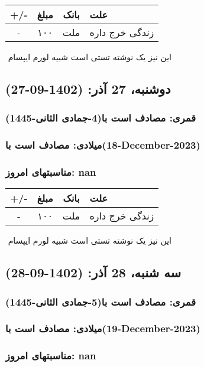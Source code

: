 \documentclass{article}
\newcommand{\rnote}[1]{\marginpar{\textcolor{color}{\StrSubstitute{\##1}{ }{\_}}}}
\newcommand{\myRow}[4]{
    #1 & #2 & #3 & #4 \\ \hline
}
\begin{document}
\begin{tabular}{ | c | c | c | p{5cm} |}
    \hline
    \myRow{ +/- }{مبلغ}{بانک}{علت}
    \myRow{-}{۱۰۰}{ملت}{زندگی خرج داره}
\end{tabular}
\newline
\newline

‌
\rnote{تست}
این نیز یک نوشته تستی است شبیه لورم ایپسام




\newpage
{}
\textcolor{color}{
\section{ دوشنبه، 27 آذر: (1402-09-27) }
\subsubsection*{قمری: مصادف است با(4-جمادی الثانی-1445)} 
\subsubsection*{میلادی: مصادف است با(18-December-2023)}
\subsubsection*{مناسبتهای امروز: nan}
}


\begin{tabular}{ | c | c | c | p{5cm} |}
    \hline
    \myRow{ +/- }{مبلغ}{بانک}{علت}
    \myRow{-}{۱۰۰}{ملت}{زندگی خرج داره}
\end{tabular}
\newline
\newline

‌
\rnote{تست}
این نیز یک نوشته تستی است شبیه لورم ایپسام




\newpage
{}
\textcolor{color}{
\section{ سه شنبه، 28 آذر: (1402-09-28) }
\subsubsection*{قمری: مصادف است با(5-جمادی الثانی-1445)} 
\subsubsection*{میلادی: مصادف است با(19-December-2023)}
\subsubsection*{مناسبتهای امروز: nan}
}
\end{document}
